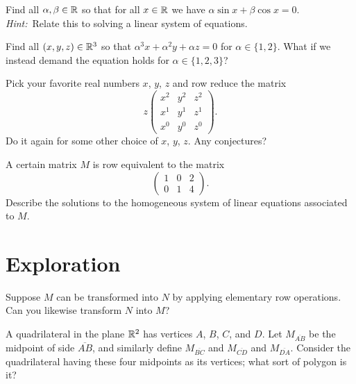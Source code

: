 \documentclass{homework}
\begin{document}
\begin{problem}
  Find all $\alpha, \beta \in \mathbb{R}$ so that for all $x \in \mathbb{R}$ we have $\alpha \sin x + \beta \cos x = 0$.  \textit{Hint:}~Relate this to solving a linear system of equations.
\end{problem}

\begin{problem}
  Find all $(x,y,z) \in \mathbb{R}^3$ so that $\alpha^3 x + \alpha^2 y + \alpha z = 0$ for $\alpha \in \{1,2\}$.  What if we instead demand the equation holds for $\alpha \in \{1,2,3\}$?
\end{problem}

\begin{problem}
  Pick your favorite real numbers $x$, $y$, $z$ and row reduce the matrix
  \[z
    \begin{pmatrix}
      x^2 & y^2 & z^2 \\
      x^1 & y^1 & z^1 \\
      x^0 & y^0 & z^0            
    \end{pmatrix}.
  \]
  Do it again for some other choice of $x$, $y$, $z$.  Any conjectures?
\end{problem}

\begin{problem}
  A certain matrix $M$ is row equivalent to the matrix
  \[
    \begin{pmatrix}
      1 & 0 & 2 \\
      0 & 1 & 4
    \end{pmatrix}.
  \]
  Describe the solutions to the homogeneous system of linear equations
  associated to $M$.
\end{problem}

\section{Exploration}

\begin{problem}
  Suppose $M$ can be transformed into $N$ by applying elementary row
  operations.  Can you likewise transform $N$ into $M$?
\end{problem}

\begin{problem}
  A quadrilateral in the plane $\mathbb{R}^2$ has vertices $A$, $B$, $C$, and
  $D$.  Let $M_{\overline{AB}}$ be the midpoint of side
  $\overline{AB}$, and similarly define $M_{\overline{BC}}$ and
  $M_{\overline{CD}}$ and $M_{\overline{DA}}$.  Consider the
  quadrilateral having these four midpoints as its vertices; what sort
  of polygon is it?
\end{problem}
\end{document}
